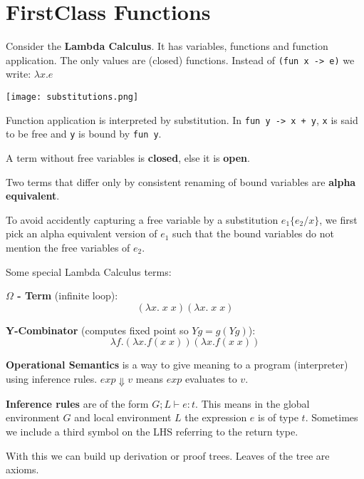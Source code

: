 \vspace{-16pt}

\section*{FirstClass Functions}

Consider the \textbf{Lambda Calculus}. It has variables, functions and function application. The only values are (closed) functions. Instead of \texttt{(fun x -> e)} we write: $\lambda x. e$

\begin{center}
	\texttt{[image: substitutions.png]}
\end{center}

Function application is interpreted by substitution. In \texttt{fun y -> x + y}, \texttt{x} is said to be free and \texttt{y} is bound by \texttt{fun y}. \medskip

A term without free variables is \textbf{closed}, else it is \textbf{open}.

Two terms that differ only by consistent renaming of bound variables are \textbf{alpha equivalent}. \medskip

To avoid accidently capturing a free variable by a substitution $e_1 \{e_2 / x\}$, we first pick an alpha equivalent version of $e_1$ such that the bound variables do not mention the free variables of $e_2$.\medskip

Some special Lambda Calculus terms:
\begin{compactitem}[$\quad\bullet$]
	\item \textbf{$\Omega$ - Term} (infinite loop):
	$$(\lambda x. \;x \;x)(\lambda x. \;x \;x)$$

	\item \textbf{Y-Combinator} (computes fixed point so $Yg = g(Yg)$):
	$$\lambda f. (\lambda x. f(x \;x))(\lambda x. f(x \;x))$$
\end{compactitem}\medskip

\textbf{Operational Semantics} is a way to give meaning to a program (interpreter) using inference rules. $exp \Downarrow v$ means $exp$ evaluates to $v$. \medskip

\textbf{Inference rules} are of the form $G; L \vdash e : t$. This means in the global environment $G$ and local environment $L$ the expression $e$ is of type $t$. Sometimes we include a third symbol on the LHS referring to the return type. \medskip

With this we can build up derivation or proof trees. Leaves of the tree are axioms.
